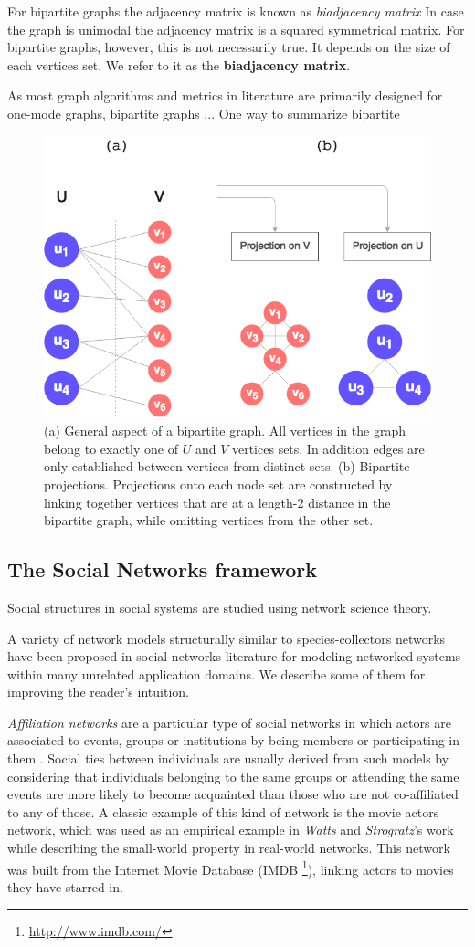 For bipartite graphs the adjacency matrix is known as \textit{biadjacency matrix}
In case the graph is unimodal the adjacency matrix is a squared symmetrical matrix.
For bipartite graphs, however, this is not necessarily true. It depends on the size of each vertices set. We refer to it as the \textbf{biadjacency matrix}.

As most graph algorithms and metrics in literature are primarily designed for one-mode graphs, bipartite graphs ...
One way to summarize bipartite 


  \begin{figure}[h!]
  	\centering
    \includegraphics[width=0.5\linewidth]{figures/bipartite_general.png}
    \caption{(a) General aspect of a bipartite graph. All vertices in the graph belong to exactly one of $U$ and $V$ vertices sets. In addition edges are only established between vertices from distinct sets. (b) Bipartite projections. Projections onto each node set are constructed by linking together vertices that are at a length-2 distance in the bipartite graph, while omitting vertices from the other set.}
    \label{fig:bipartite_general}
  \end{figure}



\subsection{The Social Networks framework}
Social structures in social systems are studied using network science theory. 



A variety of network models structurally similar to species-collectors networks have been proposed in social networks literature for modeling networked systems within many unrelated application domains. We describe some of them for improving the reader's intuition.

\textit{Affiliation networks} are a particular type of social networks in which actors are associated to events, groups or institutions by being members or participating in them \cite{Borgatti2015}. Social ties between individuals are usually derived from such models by considering that individuals belonging to the same groups or attending the same events are more likely to become acquainted than those who are not co-affiliated to any of those. 
A classic example of this kind of network is the movie actors network, which was used as an empirical example in \textit{Watts} and \textit{Strogratz}'s work \cite{Watts1998} while describing the small-world property in real-world networks.
This network was built from the Internet Movie Database (IMDB \footnote{\url{http://www.imdb.com/}}), linking actors to movies they have starred in.

